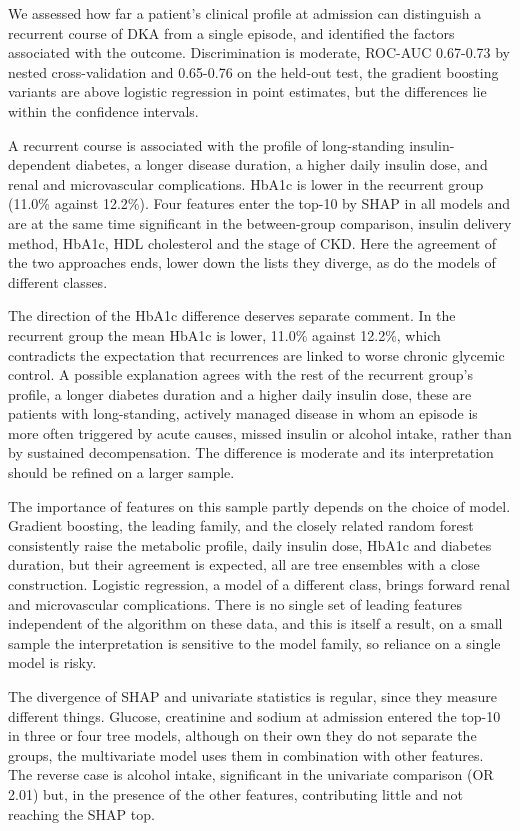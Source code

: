 \documentclass[pdflatex,sn-basic,Numbered]{sn-jnl}
\begin{document}
We assessed how far a patient's clinical profile at admission can distinguish a recurrent course of DKA from a single episode, and identified the factors associated with the outcome. Discrimination is moderate, ROC-AUC 0.67-0.73 by nested cross-validation and 0.65-0.76 on the held-out test, the gradient boosting variants are above logistic regression in point estimates, but the differences lie within the confidence intervals.

A recurrent course is associated with the profile of long-standing insulin-dependent diabetes, a longer disease duration, a higher daily insulin dose, and renal and microvascular complications. HbA1c is lower in the recurrent group (11.0\% against 12.2\%). Four features enter the top-10 by SHAP in all models and are at the same time significant in the between-group comparison, insulin delivery method, HbA1c, HDL cholesterol and the stage of CKD. Here the agreement of the two approaches ends, lower down the lists they diverge, as do the models of different classes.

The direction of the HbA1c difference deserves separate comment. In the recurrent group the mean HbA1c is lower, 11.0\% against 12.2\%, which contradicts the expectation that recurrences are linked to worse chronic glycemic control. A possible explanation agrees with the rest of the recurrent group's profile, a longer diabetes duration and a higher daily insulin dose, these are patients with long-standing, actively managed disease in whom an episode is more often triggered by acute causes, missed insulin or alcohol intake, rather than by sustained decompensation. The difference is moderate and its interpretation should be refined on a larger sample.

The importance of features on this sample partly depends on the choice of model. Gradient boosting, the leading family, and the closely related random forest consistently raise the metabolic profile, daily insulin dose, HbA1c and diabetes duration, but their agreement is expected, all are tree ensembles with a close construction. Logistic regression, a model of a different class, brings forward renal and microvascular complications. There is no single set of leading features independent of the algorithm on these data, and this is itself a result, on a small sample the interpretation is sensitive to the model family, so reliance on a single model is risky.

The divergence of SHAP and univariate statistics is regular, since they measure different things. Glucose, creatinine and sodium at admission entered the top-10 in three or four tree models, although on their own they do not separate the groups, the multivariate model uses them in combination with other features. The reverse case is alcohol intake, significant in the univariate comparison (OR 2.01) but, in the presence of the other features, contributing little and not reaching the SHAP top.
\end{document}
